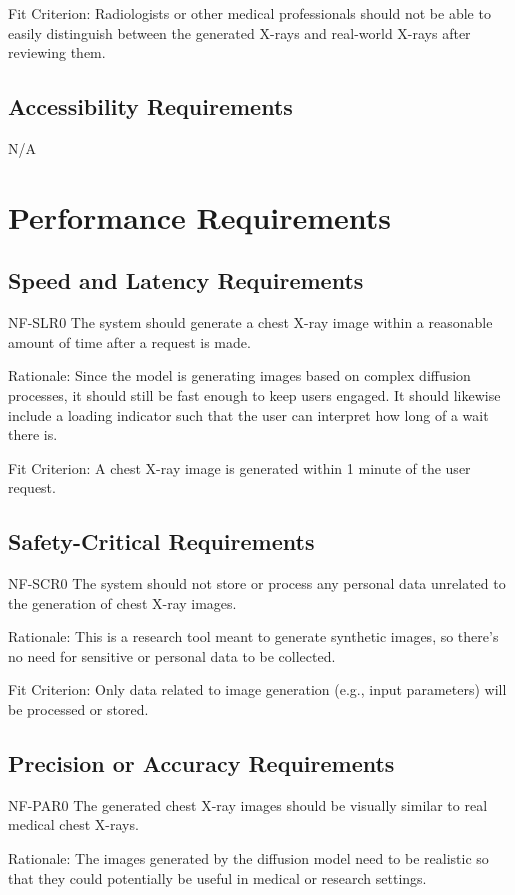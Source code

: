 \documentclass[12pt]{article}
\begin{document}
Fit Criterion: Radiologists or other medical professionals should not be able to easily 
distinguish between the generated X-rays and real-world X-rays after reviewing them.

\subsection{Accessibility Requirements}
N/A

\section{Performance Requirements}
\subsection{Speed and Latency Requirements}
NF-SLR0 The system should generate a chest X-ray image within a reasonable amount of time after a 
request is made.

Rationale: Since the model is generating images based on complex diffusion processes, it should 
still be fast enough to keep users engaged. It should likewise include a loading indicator such 
that the user can interpret how long of a wait there is.

Fit Criterion: A chest X-ray image is generated within 1 minute of the user request.

\subsection{Safety-Critical Requirements}
NF-SCR0 The system should not store or process any personal data unrelated to the generation of 
chest X-ray images.

Rationale: This is a research tool meant to generate synthetic images, so there’s no need for 
sensitive or personal data to be collected.

Fit Criterion: Only data related to image generation (e.g., input parameters) will be processed or 
stored.

\subsection{Precision or Accuracy Requirements}
NF-PAR0 The generated chest X-ray images should be visually similar to real medical chest X-rays.

Rationale: The images generated by the diffusion model need to be realistic so that they could 
potentially be useful in medical or research settings.
\end{document}
